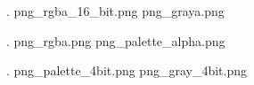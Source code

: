 .
\XeTeXpicfile png_rgba_16_bit.png
\XeTeXpicfile png_graya.png

.
\XeTeXpicfile png_rgba.png
\XeTeXpicfile png_palette_alpha.png

.
\XeTeXpicfile png_palette_4bit.png
\XeTeXpicfile png_gray_4bit.png

\bye